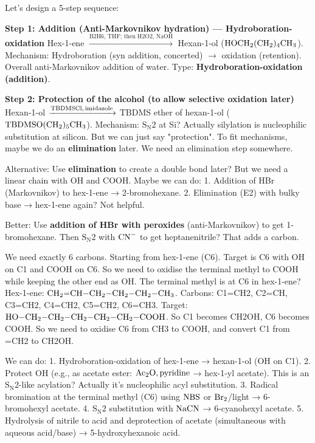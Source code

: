 \documentclass[11pt]{article}
\begin{document}
\begin{corrige}
Let's design a 5-step sequence:

\textbf{Step 1: Addition (Anti-Markovnikov hydration) — Hydroboration-oxidation}
Hex-1-ene \(\xrightarrow{\text{B2H6, THF; then H2O2, NaOH}}\) Hexan-1-ol (\(\ce{HOCH2(CH2)4CH3}\)).
Mechanism: Hydroboration (syn addition, concerted) \(\rightarrow\) oxidation (retention). Overall anti-Markovnikov addition of water. Type: \textbf{Hydroboration-oxidation (addition)}.

\textbf{Step 2: Protection of the alcohol (to allow selective oxidation later)}
Hexan-1-ol \(\xrightarrow{\ce{TBDMSCl, imidazole}}\) TBDMS ether of hexan-1-ol (\(\ce{TBDMSO(CH2)5CH3}\)).
Mechanism: \(\mathrm{S_N2}\) at Si? Actually silylation is nucleophilic substitution at silicon. But we can just say "protection". To fit mechanisms, maybe we do an \textbf{elimination} later. We need an elimination step somewhere.

Alternative: Use \textbf{elimination} to create a double bond later? But we need a linear chain with OH and COOH. Maybe we can do:
1. Addition of HBr (Markovnikov) to hex-1-ene → 2-bromohexane.
2. Elimination (E2) with bulky base → hex-1-ene again? Not helpful.

Better: Use \textbf{addition of HBr with peroxides} (anti-Markovnikov) to get 1-bromohexane. Then \(\mathrm{S_N2}\) with \(\ce{CN-}\) to get heptanenitrile? That adds a carbon.

We need exactly 6 carbons. Starting from hex-1-ene (C6). Target is C6 with OH on C1 and COOH on C6. So we need to oxidise the terminal methyl to COOH while keeping the other end as OH. The terminal methyl is at C6 in hex-1-ene? Hex-1-ene: \(\ce{CH2=CH-CH2-CH2-CH2-CH3}\). Carbons: C1=CH2, C2=CH, C3=CH2, C4=CH2, C5=CH2, C6=CH3. Target: \(\ce{HO-CH2-CH2-CH2-CH2-CH2-COOH}\). So C1 becomes CH2OH, C6 becomes COOH. So we need to oxidise C6 from CH3 to COOH, and convert C1 from =CH2 to CH2OH.

We can do:
1. Hydroboration-oxidation of hex-1-ene → hexan-1-ol (OH on C1).
2. Protect OH (e.g., as acetate ester: \(\ce{Ac2O, pyridine}\) → hex-1-yl acetate). This is an \(\mathrm{S_N2}\)-like acylation? Actually it's nucleophilic acyl substitution.
3. Radical bromination at the terminal methyl (C6) using \(\ce{NBS}\) or \(\ce{Br2}\)/light → 6-bromohexyl acetate.
4. \(\mathrm{S_N2}\) substitution with \(\ce{NaCN}\) → 6-cyanohexyl acetate.
5. Hydrolysis of nitrile to acid and deprotection of acetate (simultaneous with aqueous acid/base) → 5-hydroxyhexanoic acid.


\end{corrige}
\end{document}
